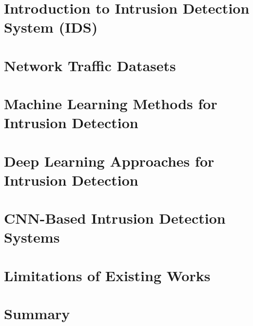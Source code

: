 \section{Introduction to Intrusion Detection System (IDS)}


\section{Network Traffic Datasets}


\section{Machine Learning Methods for Intrusion Detection}


\section{Deep Learning Approaches for Intrusion Detection}


\section{CNN-Based Intrusion Detection Systems}


\section{Limitations of Existing Works}


\section{Summary}
